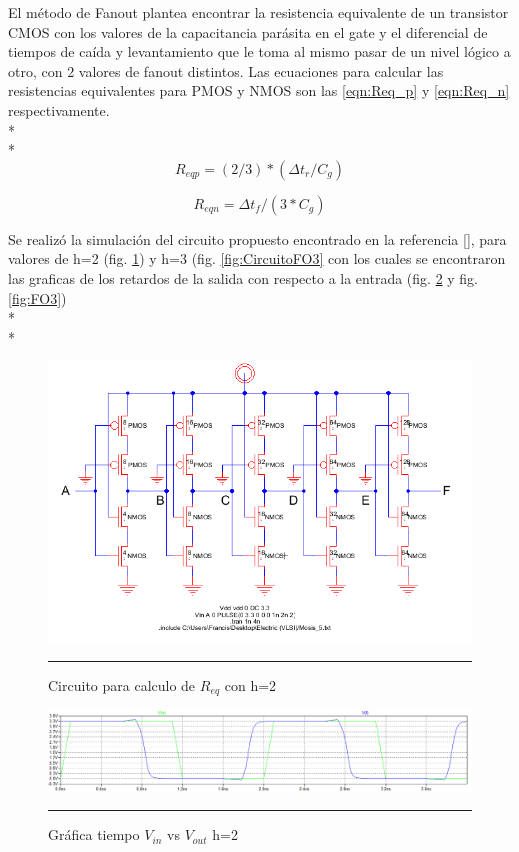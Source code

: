 \documentclass[12pt,a4paper]{article} %
\begin{document}
El método de Fanout plantea encontrar la resistencia equivalente de un transistor CMOS con los valores de la capacitancia parásita en el gate y el diferencial de tiempos de caída y levantamiento que le toma al mismo pasar de un nivel lógico a otro, con 2 valores de fanout distintos. Las ecuaciones para calcular las resistencias equivalentes para PMOS y NMOS son las \ref{eqn:Req_p} y \ref{eqn:Req_n} respectivamente.\\*
\\*
\begin{equation}\label{eqn:Req_p}
R_{eqp}=(2/3)*( \Delta t_{r}/C_{g})
\end{equation}

\begin{equation}\label{eqn:Req_n}
R_{eqn}= \Delta t_{f}/(3*C_{g})
\end{equation}

Se realizó la simulación del circuito propuesto encontrado en la referencia [], para valores de h=2 (fig. \ref{fig:CircuitoFO2}) y h=3 (fig. \ref{fig:CircuitoFO3} con los cuales se encontraron las graficas de los retardos de la salida con respecto a la entrada (fig. \ref{fig:FO2} y fig. \ref{fig:FO3})\\*
\\*
\begin{figure}[htbp]
\begin{center}
    \includegraphics[scale=0.5]{./CircuitoFO2.png}
    \rule{35em}{0.5pt}
  \caption[Captura]{Circuito para calculo de $R_{eq}$ con h=2}
  \label{fig:CircuitoFO2}
  \end{center}
\end{figure}

\begin{figure}[htbp]
  \centering
    \includegraphics[scale=0.4]{./FO2.png}
    \rule{35em}{1pt}
  \caption[Captura]{Gráfica tiempo $V_{in}$ vs $V_{out}$ h=2}
  \label{fig:FO2}
\end{figure}
\end{document}
